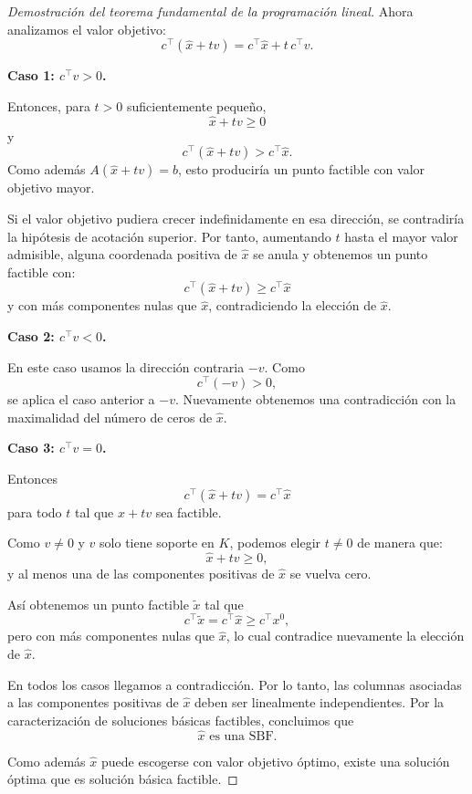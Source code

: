 \begin{proof}[Demostración del teorema fundamental de la programación lineal]
Ahora analizamos el valor objetivo:
\[
    c^\top(\widehat{x}+tv)
    =
    c^\top\widehat{x}
    +
    t\,c^\top v.
\]

\medskip

\noindent
\textbf{Caso 1: \(c^\top v>0\).}

Entonces, para \(t>0\) suficientemente pequeño,
\[
    \widehat{x}+tv\geq 0
\]
y
\[
    c^\top(\widehat{x}+tv)
    >
    c^\top\widehat{x}.
\]
Como además \(A(\widehat{x}+tv)=b\), esto produciría un punto factible con valor objetivo mayor.

Si el valor objetivo pudiera crecer indefinidamente en esa dirección, se contradiría la hipótesis de acotación superior. Por tanto, aumentando \(t\) hasta el mayor valor admisible, alguna coordenada positiva de \(\widehat{x}\) se anula y obtenemos un punto factible con:
\[
    c^\top(\widehat{x}+tv)\geq c^\top\widehat{x}
\]
y con más componentes nulas que \(\widehat{x}\), contradiciendo la elección de \(\widehat{x}\).

\medskip

\noindent
\textbf{Caso 2: \(c^\top v<0\).}

En este caso usamos la dirección contraria \(-v\). Como
\[
    c^\top(-v)>0,
\]
se aplica el caso anterior a \(-v\). Nuevamente obtenemos una contradicción con la maximalidad del número de ceros de \(\widehat{x}\).

\medskip

\noindent
\textbf{Caso 3: \(c^\top v=0\).}

Entonces
\[
    c^\top(\widehat{x}+tv)
    =
    c^\top\widehat{x}
\]
para todo \(t\) tal que \(\widehat{x}+tv\) sea factible.

Como \(v\neq 0\) y \(v\) solo tiene soporte en \(K\), podemos elegir \(t\neq 0\) de manera que:
\[
    \widehat{x}+tv\geq 0,
\]
y al menos una de las componentes positivas de \(\widehat{x}\) se vuelva cero.

Así obtenemos un punto factible \(\widetilde{x}\) tal que
\[
    c^\top \widetilde{x}
    =
    c^\top\widehat{x}
    \geq
    c^\top x^0,
\]
pero con más componentes nulas que \(\widehat{x}\), lo cual contradice nuevamente la elección de \(\widehat{x}\).

\medskip

En todos los casos llegamos a contradicción. Por lo tanto, las columnas asociadas a las componentes positivas de \(\widehat{x}\) deben ser linealmente independientes. Por la caracterización de soluciones básicas factibles, concluimos que
\[
    \widehat{x}
    \text{ es una SBF.}
\]

Como además \(\widehat{x}\) puede escogerse con valor objetivo óptimo, existe una solución óptima que es solución básica factible.
\end{proof}

